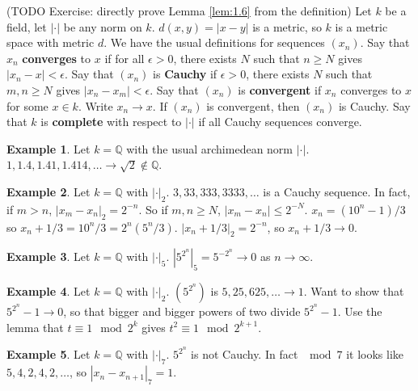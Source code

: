 \documentclass{article}
\newcommand{\Q}{\mathbb{Q}}
\newcommand{\rb}[1]{\left( #1 \right)}
\newcommand{\abs}[1]{\left\lvert #1 \right\rvert}
\theoremstyle{definition}\newtheorem{definition}{Definition}[section]
\theoremstyle{definition}\newtheorem{remark}[definition]{Remark}
\theoremstyle{definition}\newtheorem*{example}{Example}
\theoremstyle{definition}\newtheorem*{note}{Note}
\begin{document}
(TODO Exercise: directly prove Lemma \ref{lem:1.6} from the definition) Let $ k $ be a field, let $ \abs{\cdot} $ be any norm on $ k $. $ d\rb{x, y} = \abs{x - y} $ is a metric, so $ k $ is a metric space with metric $ d $. We have the usual definitions for sequences $ \rb{x_n} $. Say that $ x_n $ \textbf{converges} to $ x $ if for all $ \epsilon > 0 $, there exists $ N $ such that $ n \ge N $ gives $ \abs{x_n - x} < \epsilon $. Say that $ \rb{x_n} $ is \textbf{Cauchy} if $ \epsilon > 0 $, there exists $ N $ such that $ m, n \ge N $ gives $ \abs{x_n - x_m} < \epsilon $. Say that $ \rb{x_n} $ is \textbf{convergent} if $ x_n $ converges to $ x $ for some $ x \in k $. Write $ x_n \to x $. If $ \rb{x_n} $ is convergent, then $ \rb{x_n} $ is Cauchy. Say that $ k $ is \textbf{complete} with respect to $ \abs{\cdot} $ if all Cauchy sequences converge.

\begin{example}
Let $ k = \Q $ with the usual archimedean norm $ \abs{\cdot} $. $ 1, 1.4, 1.41, 1.414, \dots \to \sqrt{2} \notin \Q $.
\end{example}

\begin{example}
Let $ k = \Q $ with $ \abs{\cdot}_2 $. $ 3, 33, 333, 3333, \dots $ is a Cauchy sequence. In fact, if $ m > n $, $ \abs{x_m - x_n}_2 = 2^{-n} $. So if $ m, n \ge N $, $ \abs{x_m - x_n} \le 2^{-N} $. $ x_n = \rb{10^n - 1} / 3 $ so $ x_n + 1 / 3 = 10^n / 3 = 2^n\rb{5^n / 3} $. $ \abs{x_n + 1 / 3}_2 = 2^{-n} $, so $ x_n + 1 / 3 \to 0 $.
\end{example}

\begin{example}
Let $ k = \Q $ with $ \abs{\cdot}_5 $. $ \abs{5^{2^n}}_5 = 5^{-2^n} \to 0 $ as $ n \to \infty $.
\end{example}

\begin{example}
Let $ k = \Q $ with $ \abs{\cdot}_2 $. $ \rb{5^{2^n}} $ is $ 5, 25, 625, \dots \to 1 $. Want to show that $ 5^{2^n} - 1 \to 0 $, so that bigger and bigger powers of two divide $ 5^{2^n} - 1 $. Use the lemma that $ t \equiv 1 \mod 2^k $ gives $ t^2 \equiv 1 \mod 2^{k + 1} $.
\end{example}

\begin{example}
Let $ k = \Q $ with $ \abs{\cdot}_7 $. $ 5^{2^n} $ is not Cauchy. In fact $ \mod 7 $ it looks like $ 5, 4, 2, 4, 2, \dots $, so $ \abs{x_n - x_{n + 1}}_7 = 1 $.
\end{example}
\end{document}
